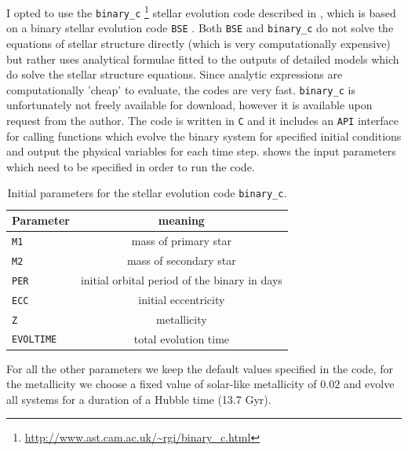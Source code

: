 \documentclass[twoside,openright,titlepage,numbers=noenddot,headinclude,%
                footinclude=true,cleardoublepage=empty,abstractoff, 
                BCOR=5mm,paper=a4,fontsize=11pt,%
                american,%
                ]{scrreprt}%
\begin{document}
I opted to use the \texttt{binary\_c}
\footnote{\url{http://www.ast.cam.ac.uk/~rgi/binary_c.html}}
stellar evolution code described in
\citet{izzard2004,izzard2006,izzard2009}, which is based on a binary
stellar evolution code \texttt{BSE} \citep{hurley2002}. Both \texttt{BSE}
and \texttt{binary\_c} do not solve the equations of stellar structure directly
(which is very computationally expensive) but rather uses analytical formulae
fitted to the outputs of detailed models which do solve the stellar structure
equations. Since analytic expressions are computationally 'cheap' to evaluate,
the codes are very fast. \texttt{binary\_c}
is unfortunately not freely available for download, however it is available
upon request from the author. The code is written in \texttt{C} and it
includes an \texttt{API} interface for calling functions which 
evolve the binary system for specified initial conditions and output the
physical variables for each time step.  shows
the input parameters which need to be specified in order to run the code.
\begin{table}[h!]
\centering
\begin{tabular}{lc}
\toprule
    Parameter & meaning\\
\midrule
    \texttt{M1} & mass of primary star\\
    \texttt{M2} & mass of secondary star\\
    \texttt{PER} & initial orbital period of the binary in days\\
    \texttt{ECC} & initial eccentricity\\
    \texttt{Z} & metallicity\\
    \texttt{EVOLTIME} & total evolution time\\
\bottomrule
\end{tabular}
    \caption{Initial parameters for the stellar evolution code \texttt{binary\_c}.}
\label{table:binary_c_params}
\end{table}
For all the other parameters we keep the default values specified in the code, for 
the metallicity we choose a fixed value of solar-like metallicity of $0.02$ and 
evolve all systems for a duration of a Hubble time (13.7 Gyr).
\end{document}
